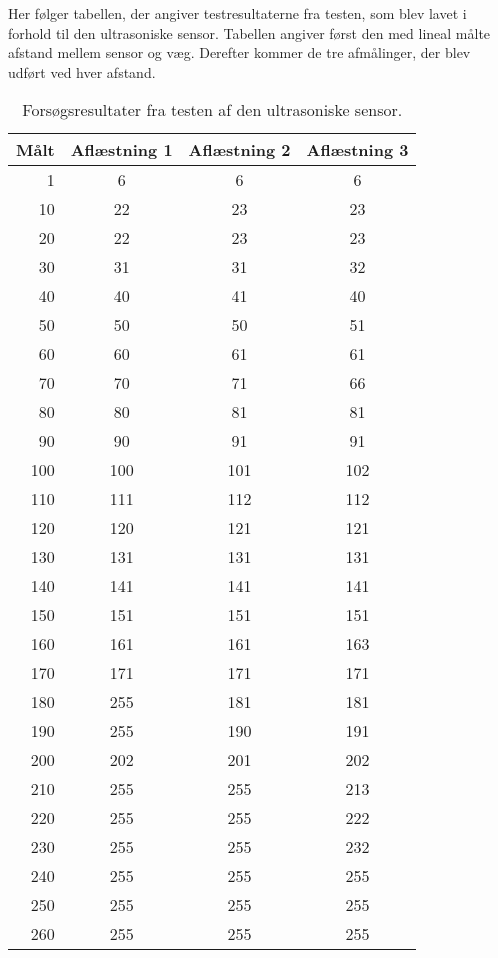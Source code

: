 
\label{appendix:ultrasonisk}
Her følger tabellen, der angiver testresultaterne fra testen, som blev lavet i forhold til den ultrasoniske sensor.
Tabellen angiver først den med lineal målte afstand mellem sensor og væg.
Derefter kommer de tre afmålinger, der blev udført ved hver afstand.
\begin{table}[H]
\centering
\begin{tabular}{r | c | c | c |}
Målt & Aflæstning 1 & Aflæstning 2 & Aflæstning 3 \\
\hline
1 & 6 & 6 & 6 \\
10&	22&	23&	23\\
20&	22&	23&	23\\
30&	31&	31&	32\\
40&	40&	41&	40\\
50&	50&	50&	51\\
60&	60&	61&	61\\
70&	70&	71&	66\\
80&	80&	81&	81\\
90&	90&	91&	91\\
100&	100&	101&	102\\
110&	111&	112&	112\\
120&	120&	121&	121\\
130&	131&	131&	131\\
140&	141&	141&	141\\
150&	151&	151&	151\\
160&	161&	161&	163\\
170&	171&	171&	171\\
180&	255&	181&	181\\
190&	255&	190&	191\\
200&	202&	201&	202\\
210&	255&	255&	213\\
220&	255&	255&	222\\
230&	255&	255&	232\\
240&	255&	255&	255\\
250&	255&	255&	255\\
260&	255&	255&	255\\
\end{tabular}
\caption{Forsøgsresultater fra testen af den ultrasoniske sensor.}
\label{sensor:ultrasonic_test_data}
\end{table}